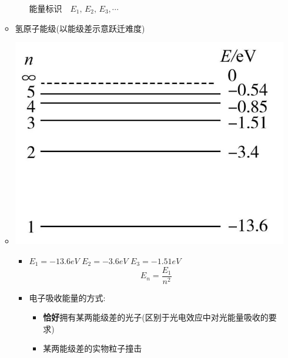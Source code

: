 \documentclass{article}
\begin{document}
\begin{itemize}
\begin{itemize}
\begin{minipage}{0.52\textwidth}
\begin{itemize}
                              $\text{能量标识} \quad E_{1}, \, E_{2}, \, E_{3}, \cdots$
                      \end{itemize}
                  \end{minipage}

                  \vspace{3em}

              \item[] 氢原子能级(以能级差示意跃迁难度)
              \item[]
                  \begin{minipage}{0.4\textwidth}
                      \includegraphics[width = \textwidth]{./pictures/19.png}
                  \end{minipage}
                  \hfill\hspace{-3em}
                  \begin{minipage}{0.52\textwidth}
                      \begin{itemize}
                          \vspace*{-2em}
                          \item $E_{1}=-13.6eV \,\, E_{2} = -3.6eV \,\, E_{3} = -1.51eV $
                                $$E_{n} =  \dfrac{E_{1}}{n^{2}}$$
                          \item 电子吸收能量的方式:
                                \begin{itemize}
                                    \item[] \textbf{恰好}拥有某两能级差的光子(区别于光电效应中对光能量吸收的要求)
                                    \item[] 某两能级差的实物粒子撞击

\end{itemize}
\end{itemize}
\end{minipage}
\end{itemize}
\end{itemize}
\end{document}
